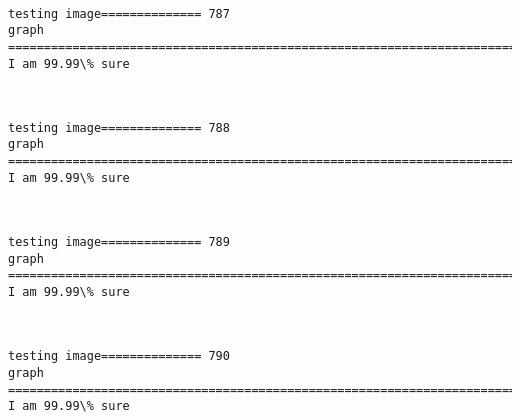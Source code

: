 \documentclass[11pt]{article}
\begin{document}
    \begin{center}
    \end{center}
    { \hspace*{\fill} \\}
    
    \begin{Verbatim}[commandchars=\\\{\}]
testing image============== 787
graph
============================================================================
I am 99.99\% sure

    \end{Verbatim}

    \begin{center}
    \end{center}
    { \hspace*{\fill} \\}
    
    \begin{Verbatim}[commandchars=\\\{\}]
testing image============== 788
graph
============================================================================
I am 99.99\% sure

    \end{Verbatim}

    \begin{center}
    \end{center}
    { \hspace*{\fill} \\}
    
    \begin{Verbatim}[commandchars=\\\{\}]
testing image============== 789
graph
============================================================================
I am 99.99\% sure

    \end{Verbatim}

    \begin{center}
    \end{center}
    { \hspace*{\fill} \\}
    
    \begin{Verbatim}[commandchars=\\\{\}]
testing image============== 790
graph
============================================================================
I am 99.99\% sure

    \end{Verbatim}
\end{document}
